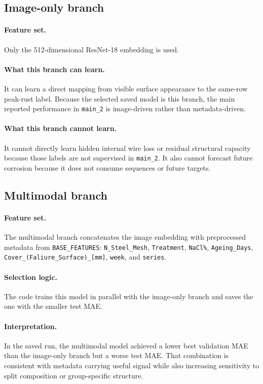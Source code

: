 \documentclass[11pt]{article}
\begin{document}
\subsection{Image-only branch}
\paragraph{Feature set.}
Only the 512-dimensional ResNet-18 embedding is used.

\paragraph{What this branch can learn.}
It can learn a direct mapping from visible surface appearance to the same-row peak-rust label. Because the selected saved model is this branch, the main reported performance in \texttt{main\_2} is image-driven rather than metadata-driven.

\paragraph{What this branch cannot learn.}
It cannot directly learn hidden internal wire loss or residual structural capacity because those labels are not supervised in \texttt{main\_2}. It also cannot forecast future corrosion because it does not consume sequences or future targets.

\subsection{Multimodal branch}
\paragraph{Feature set.}
The multimodal branch concatenates the image embedding with preprocessed metadata from \texttt{BASE\_FEATURES}: \texttt{N\_Steel\_Mesh}, \texttt{Treatment}, \texttt{NaCl\%}, \texttt{Ageing\_Days}, \texttt{Cover\_(Faliure\_Surface)\_[mm]}, \texttt{week}, and \texttt{series}.

\paragraph{Selection logic.}
The code trains this model in parallel with the image-only branch and saves the one with the smaller test MAE.

\paragraph{Interpretation.}
In the saved run, the multimodal model achieved a lower best validation MAE than the image-only branch but a worse test MAE. That combination is consistent with metadata carrying useful signal while also increasing sensitivity to split composition or group-specific structure.
\end{document}
